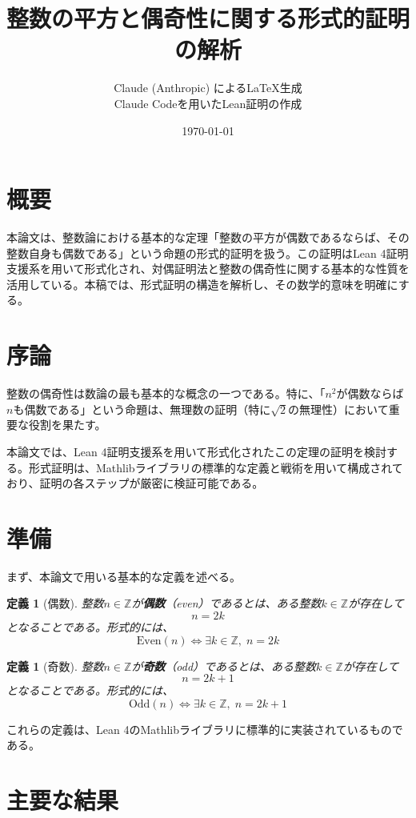 \documentclass[uplatex, a4paper]{jlreq}
\title{整数の平方と偶奇性に関する形式的証明の解析}
\author{Claude (Anthropic) によるLaTeX生成\\
Claude Codeを用いたLean証明の作成}
\date{\today}
\newtheorem{definition}[theorem]{定義}
\begin{document}
\maketitle

\section*{概要}

本論文は、整数論における基本的な定理「整数の平方が偶数であるならば、その整数自身も偶数である」という命題の形式的証明を扱う。この証明はLean 4証明支援系を用いて形式化され、対偶証明法と整数の偶奇性に関する基本的な性質を活用している。本稿では、形式証明の構造を解析し、その数学的意味を明確にする。

\section{序論}

整数の偶奇性は数論の最も基本的な概念の一つである。特に、「$n^2$が偶数ならば$n$も偶数である」という命題は、無理数の証明（特に$\sqrt{2}$の無理性）において重要な役割を果たす。

本論文では、Lean 4証明支援系を用いて形式化されたこの定理の証明を検討する。形式証明は、Mathlibライブラリの標準的な定義と戦術を用いて構成されており、証明の各ステップが厳密に検証可能である。

\section{準備}

まず、本論文で用いる基本的な定義を述べる。

\begin{definition}[偶数]
整数$n \in \mathbb{Z}$が\textbf{偶数}（even）であるとは、ある整数$k \in \mathbb{Z}$が存在して
\[
n = 2k
\]
となることである。形式的には、
\[
\text{Even}(n) \iff \exists k \in \mathbb{Z}, \; n = 2k
\]
\end{definition}

\begin{definition}[奇数]
整数$n \in \mathbb{Z}$が\textbf{奇数}（odd）であるとは、ある整数$k \in \mathbb{Z}$が存在して
\[
n = 2k + 1
\]
となることである。形式的には、
\[
\text{Odd}(n) \iff \exists k \in \mathbb{Z}, \; n = 2k + 1
\]
\end{definition}

これらの定義は、Lean 4のMathlibライブラリに標準的に実装されているものである。

\section{主要な結果}
\end{document}
